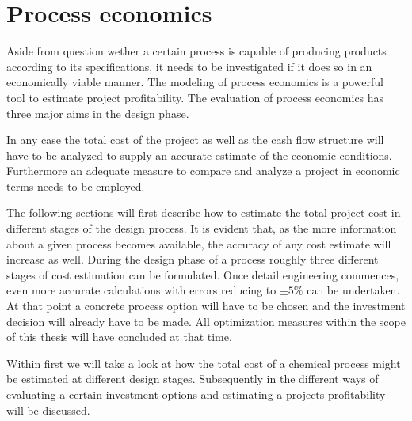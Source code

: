 \chapter{Process economics}
\label{chp:ProcesEconomics}

Aside from question wether a certain process is capable of producing products according to its
specifications, it needs to be investigated if it does so in an economically viable manner. The modeling
of process economics is a powerful tool to estimate project profitability. The evaluation of process
economics has three major aims in the design phase.

%

In any case the total cost of the project as well as the cash flow structure will have to be analyzed to supply
an accurate estimate of the economic conditions. Furthermore an adequate measure to compare and
analyze a project in economic terms needs to be employed.

The following sections will first describe how to estimate the total project cost in different stages of the
design process. It is evident that, as the more information about a given process becomes available, the
accuracy of any cost estimate will increase as well. During the design phase of a process roughly three
different stages of cost estimation can be formulated.
Once detail engineering commences, even more accurate calculations with errors reducing to $\pm 5\%$
can be undertaken\cite{Peters.2003}. At that point a concrete process option will have to be chosen and
the investment decision will already have to be made. All optimization measures within the scope of this
thesis will have concluded at that time.

Within  first we will take a look at how the total cost of a chemical process might be
estimated at different design stages. Subsequently in  the different ways
of evaluating a certain investment options and estimating a projects profitability will be discussed.

